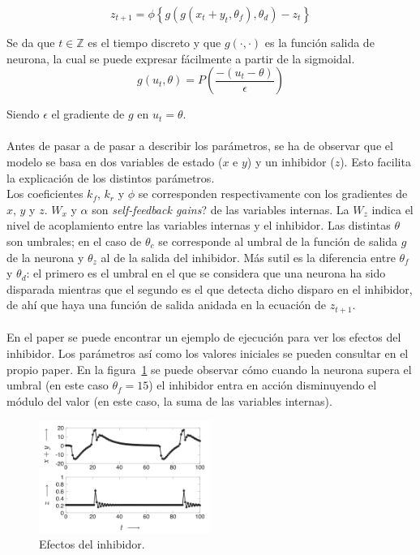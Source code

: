 \documentclass[11pt]{amsart}
\begin{document}
$$
z_{t+1}=\phi\left\{g\left( g(x_{t}+y_{t},\theta_{f}),\theta_{d}\right) -z_{t} \right\}
$$

Se da que $t\in\mathbb{Z}$ es el tiempo discreto y que $g(\cdot , \cdot)$ es la funci\'on salida de neurona,
la cual se puede expresar f\'acilmente a partir de la sigmoidal.\\

$$
g(u_{t},\theta)=P(\frac{-(u_{t}-\theta)}{\epsilon})
$$

Siendo $\epsilon$ el gradiente de $g$ en $u_{t}=\theta$.\\\\

Antes de pasar a de pasar a describir los par\'ametros, se ha de observar que el modelo se basa en dos variables
de estado ($x$ e $y$) y un inhibidor ($z$). Esto facilita la explicaci\'on de los distintos par\'ametros.\\

Los coeficientes $k_{f}$, $k_{r}$ y $\phi$ se corresponden respectivamente con los gradientes de $x$, $y$ y $z$.
$W_{x}$ y $\alpha$ son \emph{self-feedback gains}? de las variables internas. La $W_{z}$ indica el nivel de
acoplamiento entre las variables internas y el inhibidor. Las distintas $\theta$ son umbrales; en el caso de
$\theta_{c}$ se corresponde al umbral de la funci\'on de salida $g$ de la neurona y $\theta_{z}$ al de la salida
del inhibidor. M\'as sutil es la diferencia entre $\theta_{f}$ y $\theta_{d}$: el primero es el umbral en el
que se considera que una neurona ha sido disparada mientras que el segundo es el que detecta dicho disparo en
el inhibidor, de ahí que haya una funci\'on de salida anidada en la ecuaci\'on de $z_{t+1}$.\\\\

En el paper se puede encontrar un ejemplo de ejecuci\'on para ver los efectos del inhibidor. Los par\'ametros
as\'i como los valores iniciales se pueden consultar en el propio paper. En la figura~\ref{fig:oscillator-effect}
se puede observar c\'omo cuando la neurona supera el umbral (en este caso $\theta_{f}=15$) el inhibidor entra
en acci\'on disminuyendo el m\'odulo del valor (en este caso, la suma de las variables internas).

\begin{figure}[h]
\centering
\includegraphics[width=0.5\textwidth]{img/oscillator-effect.png}
\caption{Efectos del inhibidor.}
\label{fig:oscillator-effect}
\end{figure}
\end{document}
